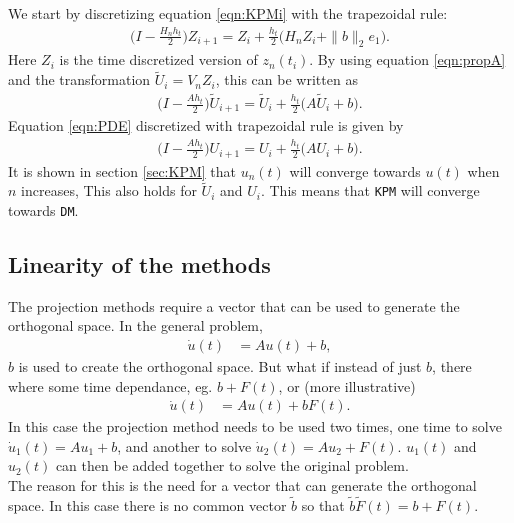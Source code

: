 \noindent We start by discretizing equation \eqref{eqn:KPMi} with the trapezoidal rule:
\begin{equation*}
\begin{aligned}
\Big(I-\frac{H_n h_t}{2}\Big) Z_{i+1} = Z_i + \frac{h_t}{2} \big( H_n Z_i + \| b \|_2 e_1 \big) .
\end{aligned}
\end{equation*}
Here $Z_i$ is the time discretized version of $z_n(t_i)$.
By using equation \eqref{eqn:propA} and the transformation $\tilde{U}_i = V_n Z_i$, this can be written as
\begin{equation*}
\begin{aligned}
\Big(I-\frac{Ah_t}{2} \Big) \tilde{U}_{i+1} =  \tilde{U}_i + \frac{h_t}{2} \big( A \tilde{U}_i +b \big) .
\end{aligned}
\end{equation*}
Equation \eqref{eqn:PDE} discretized with trapezoidal rule is given by
\begin{equation*}
\begin{aligned}
\Big(I-\frac{Ah_t}{2} \Big) U_{i+1} =  U_i + \frac{h_t}{2} \big( A U_i +b \big) .
\end{aligned}
\end{equation*}
It is shown in section \ref{sec:KPM} that $u_n(t)$ will converge towards $u(t)$ when $n$ increases, This also holds for $\tilde{U}_i$ and $ U_i $. This means that \texttt{KPM} will converge towards \texttt{DM}.

\subsection{Linearity of the methods} %
The projection methods require a vector that can be used to generate the orthogonal space. In the general problem,
\begin{equation*}
\begin{aligned}
\dot{u}(t) &= Au(t) + b,
\end{aligned}
\end{equation*} 
$b$ is used to create the orthogonal space. But what if instead of just $b$, there where some time dependance, eg. $b + F(t)$, or (more illustrative)
\begin{equation*}
\begin{aligned}
\dot{u}(t) &= Au(t) + b F(t).
\end{aligned}
\end{equation*} 
In this case the projection method needs to be used two times, one time to solve $ \dot{u}_1(t) = Au_1 + b $, and another to solve $ \dot{u}_2(t) = Au_2 + F(t) $. $u_1(t)$ and $u_2(t)$ can then be added together to solve the original problem. \\
The reason for this is the need for a vector that can generate the orthogonal space. In this case there is no common vector $\tilde{b}$ so that $\tilde{b} \tilde{F}(t) = b + F(t)$. \\

